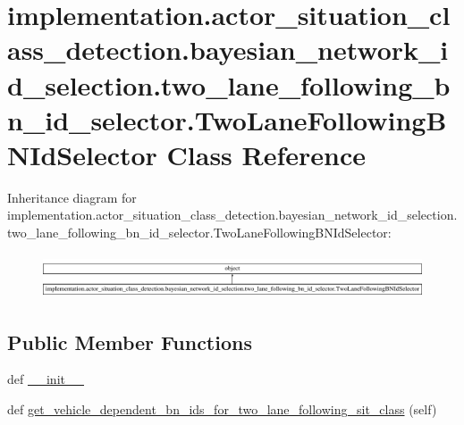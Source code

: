 \hypertarget{classimplementation_1_1actor__situation__class__detection_1_1bayesian__network__id__selection_1_ad1cbe3342f1a4b96bc86989d1def5fb}{}\section{implementation.\+actor\+\_\+situation\+\_\+class\+\_\+detection.\+bayesian\+\_\+network\+\_\+id\+\_\+selection.\+two\+\_\+lane\+\_\+following\+\_\+bn\+\_\+id\+\_\+selector.\+Two\+Lane\+Following\+B\+N\+Id\+Selector Class Reference}
\label{classimplementation_1_1actor__situation__class__detection_1_1bayesian__network__id__selection_1_ad1cbe3342f1a4b96bc86989d1def5fb}
Inheritance diagram for implementation.\+actor\+\_\+situation\+\_\+class\+\_\+detection.\+bayesian\+\_\+network\+\_\+id\+\_\+selection.\+two\+\_\+lane\+\_\+following\+\_\+bn\+\_\+id\+\_\+selector.\+Two\+Lane\+Following\+B\+N\+Id\+Selector\+:\begin{figure}[H]
\begin{center}
\leavevmode
\includegraphics[height=1.323877cm]{classimplementation_1_1actor__situation__class__detection_1_1bayesian__network__id__selection_1_ad1cbe3342f1a4b96bc86989d1def5fb}
\end{center}
\end{figure}
\subsection*{Public Member Functions}
\begin{DoxyCompactItemize}
\item 
def \hyperlink{classimplementation_1_1actor__situation__class__detection_1_1bayesian__network__id__selection_1_ad1cbe3342f1a4b96bc86989d1def5fb_a6fe5c440b4a8444911dc61a92aa24458}{\+\_\+\+\_\+init\+\_\+\+\_\+}
\item 
def \hyperlink{classimplementation_1_1actor__situation__class__detection_1_1bayesian__network__id__selection_1_ad1cbe3342f1a4b96bc86989d1def5fb_a5ae004992c5f35c654286aaae76a3f4b}{get\+\_\+vehicle\+\_\+dependent\+\_\+bn\+\_\+ids\+\_\+for\+\_\+two\+\_\+lane\+\_\+following\+\_\+sit\+\_\+class} (self)
\end{DoxyCompactItemize}


